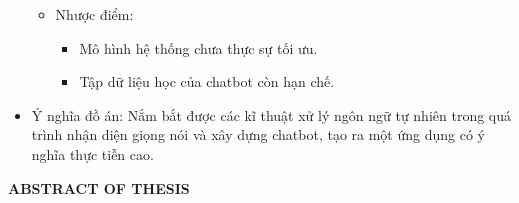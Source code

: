 \documentclass[12pt]{report}
\begin{document}
\begin{itemize}
\begin{itemize}
\begin{itemize}
		\end{itemize}
		\item Nhược điểm:
		\begin{itemize}
			\item Mô hình hệ thống chưa thực sự tối ưu.
			\item Tập dữ liệu học của chatbot còn hạn chế.
		\end{itemize}
	\end{itemize}
	\item Ý nghĩa đồ án: Nắm bắt được các kĩ thuật xử lý ngôn ngữ tự nhiên trong quá trình nhận diện giọng nói và xây dựng chatbot, tạo ra một ứng dụng có ý nghĩa thực tiễn cao.
\end{itemize}

\newpage

\begin{center}
{\large \textbf{ABSTRACT OF THESIS}}
\end{center}
\end{document}
